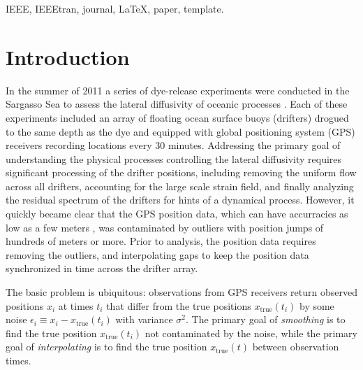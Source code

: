 \documentclass[10pt,journal]{IEEEtran}
\begin{document}
\begin{IEEEkeywords}
IEEE, IEEEtran, journal, \LaTeX, paper, template.
\end{IEEEkeywords}




%
\section{Introduction}
%



In the summer of 2011 a series of dye-release experiments were conducted in the Sargasso Sea to assess the lateral diffusivity of oceanic processes \cite{shcherbina2015-bams}. Each of these experiments included an array of floating ocean surface buoys (drifters) drogued to the same depth as the dye and equipped with global positioning system (GPS) receivers recording locations every 30 minutes. Addressing the primary goal of understanding the physical processes controlling the lateral diffusivity requires significant processing of the drifter positions, including removing the uniform flow across all drifters, accounting for the large scale strain field, and finally analyzing the residual spectrum of the drifters for hints of a dynamical process. However, it quickly became clear that the GPS position data, which can have accurracies as low as a few meters \cite{faa2016-report}, was contaminated by outliers  with position jumps of hundreds of meters or more. Prior to analysis, the position data requires removing the outliers, and interpolating gaps to keep the position data synchronized in time across the drifter array.

The basic problem is ubiquitous: observations from GPS receivers return observed positions $x_i$ at times $t_i$ that differ from the true positions $x_{\textrm{true}}(t_i)$ by some noise $\epsilon_i \equiv x_i - x_{\textrm{true}}(t_i)$ with variance $\sigma^2$. The primary goal of \emph{smoothing} is to find the true position $x_{\textrm{true}}(t_i)$ not contaminated by the noise, while the primary goal of \emph{interpolating} is to find the true position $x_{\textrm{true}}(t)$ between observation times.
\end{document}
